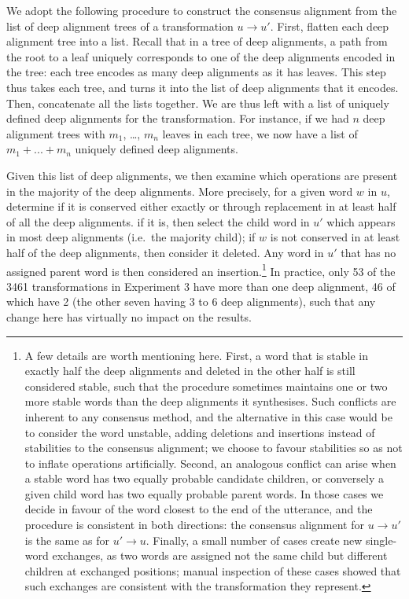 We adopt the following procedure to construct the consensus alignment
from the list of deep alignment trees of a transformation
\(u \rightarrow u'\). First, flatten each deep alignment tree into a
list. Recall that in a tree of deep alignments, a path from the root to
a leaf uniquely corresponds to one of the deep alignments encoded in the
tree: each tree encodes as many deep alignments as it has leaves. This
step thus takes each tree, and turns it into the list of deep alignments
that it encodes. Then, concatenate all the lists together. We are thus
left with a list of uniquely defined deep alignments for the
transformation. For instance, if we had \(n\) deep alignment trees with
\(m_1\), \ldots{}, \(m_n\) leaves in each tree, we now have a list of
\(m_1 + ... + m_n\) uniquely defined deep alignments.

Given this list of deep alignments, we then examine which operations are
present in the majority of the deep alignments. More precisely, for a
given word \(w\) in \(u\), determine if it is conserved either exactly
or through replacement in at least half of all the deep alignments. if
it is, then select the child word in \(u'\) which appears in most deep
alignments (i.e.~the majority child); if \(w\) is not conserved in at
least half of the deep alignments, then consider it deleted. Any word in
\(u'\) that has no assigned parent word is then considered an insertion.\footnote{
A few details are worth mentioning here. First, a word that is stable in
exactly half the deep alignments and deleted in the other half is still
considered stable, such that the procedure sometimes maintains one or
two more stable words than the deep alignments it synthesises. Such
conflicts are inherent to any consensus method, and the alternative in
this case would be to consider the word unstable, adding deletions and
insertions instead of stabilities to the consensus alignment; we choose
to favour stabilities so as not to inflate operations artificially.
Second, an analogous conflict can arise when a stable word has two
equally probable candidate children, or conversely a given child word
has two equally probable parent words. In those cases we decide in
favour of the word closest to the end of the utterance, and the
procedure is consistent in both directions: the consensus alignment for
\(u \rightarrow u'\) is the same as for \(u' \rightarrow u\). Finally, a
small number of cases create new single-word exchanges, as two words are
assigned not the same child but different children at exchanged
positions; manual inspection of these cases showed that such exchanges
are consistent with the transformation they represent.}
In practice, only 53 of the 3461 transformations in Experiment 3 have more than one deep
alignment, 46 of which have 2 (the other seven having 3 to 6 deep
alignments), such that any change here has virtually no impact on the
results.

